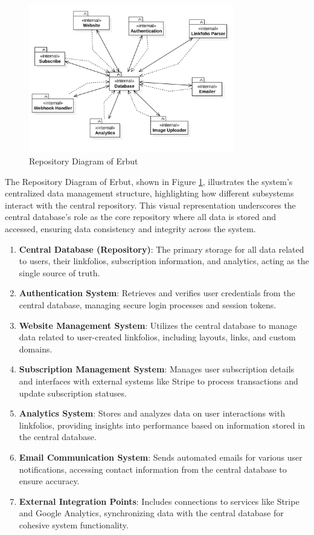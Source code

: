 \documentclass[a4paper]{report}
\begin{document}
\begin{figure}[h!]
    \centering
    \includegraphics[width=0.8\textwidth]{images/erbut-repository-diagram.png}
    \caption{Repository Diagram of Erbut}
    \label{fig:repository-diagram}
\end{figure}

The Repository Diagram of Erbut, shown in Figure \ref{fig:repository-diagram}, illustrates the system's centralized data management structure, highlighting how different subsystems interact with the central repository. This visual representation underscores the central database's role as the core repository where all data is stored and accessed, ensuring data consistency and integrity across the system.

\begin{enumerate}
    \item \textbf{Central Database (Repository)}: The primary storage for all data related to users, their linkfolios, subscription information, and analytics, acting as the single source of truth.
    \item \textbf{Authentication System}: Retrieves and verifies user credentials from the central database, managing secure login processes and session tokens.
    \item \textbf{Website Management System}: Utilizes the central database to manage data related to user-created linkfolios, including layouts, links, and custom domains.
    \item \textbf{Subscription Management System}: Manages user subscription details and interfaces with external systems like Stripe to process transactions and update subscription statuses.
    \item \textbf{Analytics System}: Stores and analyzes data on user interactions with linkfolios, providing insights into performance based on information stored in the central database.
    \item \textbf{Email Communication System}: Sends automated emails for various user notifications, accessing contact information from the central database to ensure accuracy.
    \item \textbf{External Integration Points}: Includes connections to services like Stripe and Google Analytics, synchronizing data with the central database for cohesive system functionality.
\end{enumerate}
\end{document}
